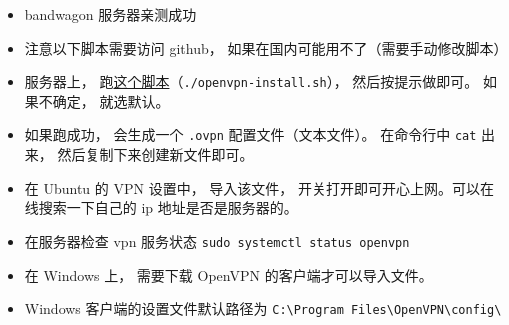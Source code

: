 
\begin{issues}
\issueDraft
\end{issues}

\begin{itemize}
\item bandwagon 服务器亲测成功
\item 注意以下脚本需要访问 github， 如果在国内可能用不了（需要手动修改脚本）
\item 服务器上， 跑\href{https://github.com/MacroUniverse/openvpn-install/blob/master/openvpn-install.sh}{这个脚本}（\verb`./openvpn-install.sh`）， 然后按提示做即可。 如果不确定， 就选默认。
\item 如果跑成功， 会生成一个 \verb`.ovpn` 配置文件（文本文件）。 在命令行中 \verb`cat` 出来， 然后复制下来创建新文件即可。
\item 在 Ubuntu 的 VPN 设置中， 导入该文件， 开关打开即可开心上网。可以在线搜索一下自己的 ip 地址是否是服务器的。
\item 在服务器检查 vpn 服务状态 \verb`sudo systemctl status openvpn`
\item 在 Windows 上， 需要下载 OpenVPN 的客户端才可以导入文件。
\item Windows 客户端的设置文件默认路径为 \verb`C:\Program Files\OpenVPN\config\`
\end{itemize}
